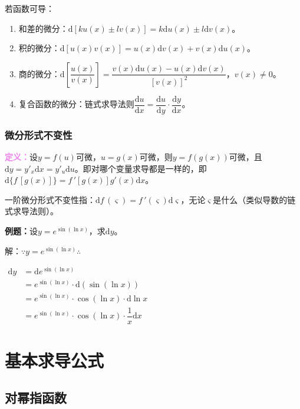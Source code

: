 \documentclass[UTF8, 12pt]{ctexart}
\begin{document}
若函数可导：

\begin{enumerate}
    \item 和差的微分：$\textrm{d}[ku(x)\pm lv(x)]=k\textrm{d}u(x)\pm l\textrm{d}v(x)$。
    \item 积的微分：$\textrm{d}[u(x)v(x)]=u(x)\textrm{d}v(x)+v(x)\textrm{d}u(x)$。
    \item 商的微分：$\textrm{d}\left[\dfrac{u(x)}{v(x)}\right]=\dfrac{v(x)\textrm{d}u(x)-u(x)\textrm{d}v(x)}{[v(x)]^2}$，$v(x)\neq 0$。
    \item 复合函数的微分：链式求导法则$\dfrac{\textrm{d}u}{\textrm{d}x}=\dfrac{\textrm{d}u}{\textrm{d}y}\cdot\dfrac{\textrm{d}y}{\textrm{d}x}$。
\end{enumerate}

\subsubsection{微分形式不变性}

\textcolor{violet}{\textbf{定义：}}设$y=f(u)$可微，$u=g(x)$可微，则$y=f(g(x))$可微，且$\textrm{d}y=y'_{x}\textrm{d}x=y'_{u}\textrm{d}u$。即对哪个变量求导都是一样的，即$\textrm{d}\{f\,[g(x)]\}=f\,'[g(x)]g'(x)\textrm{d}x$。

一阶微分形式不变性指：$\textrm{d}f\,(\varsigma)=f\,'(\varsigma)\textrm{d}\varsigma$，无论$\varsigma$是什么（类似导数的链式求导法则）。

\textbf{例题：}设$y=e^{\sin(\ln x)}$，求$\textrm{d}y$。

解：$\because y=e^{\sin(\ln x)} \therefore$

$
\begin{aligned}
    \textrm{d}y &=\textrm{d}e^{\sin(\ln x)} \\
    & =e^{\sin(\ln x)}\cdot\textrm{d}(\sin(\ln x)) \\
    & =e^{\sin(\ln x)}\cdot\cos(\ln x)\cdot\textrm{d}\ln x \\
    & =e^{\sin(\ln x)}\cdot\cos(\ln x)\cdot\dfrac{1}{x}\textrm{d}x
\end{aligned}
$

\section{基本求导公式}

\subsection{对幂指函数}
\end{document}
